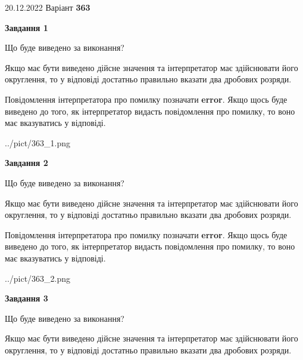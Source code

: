 \documentclass[12pt, ukrainian]{article}
\begin{document}
{20.12.2022 Варіант \No \textbf { 363 }\par}
{
\begin {Large}

{\begin {center}\textbf{Завдання 1}\end {center}}\par
Що буде виведено за виконання? \par

Якщо має бути виведено дійсне значення та інтерпретатор має здійснювати його округлення, 
то у відповіді достатньо правильно вказати два дробових розряди.

Повідомлення інтерпретатора про помилку позначати \textbf{error}.
Якщо щось буде виведено до того, як інтерпретатор видасть повідомлення про помилку, 
то воно має вказуватись у відповіді. \par

\begin{center}
	{../pict/363_1.png}
\end{center}
\newpage

{\begin {center}\textbf{Завдання 2}\end {center}}\par
Що буде виведено за виконання? \par

Якщо має бути виведено дійсне значення та інтерпретатор має здійснювати його округлення, 
то у відповіді достатньо правильно вказати два дробових розряди.

Повідомлення інтерпретатора про помилку позначати \textbf{error}.
Якщо щось буде виведено до того, як інтерпретатор видасть повідомлення про помилку, 
то воно має вказуватись у відповіді. \par

\begin{center}
	{../pict/363_2.png}
\end{center}
\newpage

{\begin {center}\textbf{Завдання 3}\end {center}}\par
Що буде виведено за виконання? \par

Якщо має бути виведено дійсне значення та інтерпретатор має здійснювати його округлення, 
то у відповіді достатньо правильно вказати два дробових розряди.


\end{Large}}
\end{document}
